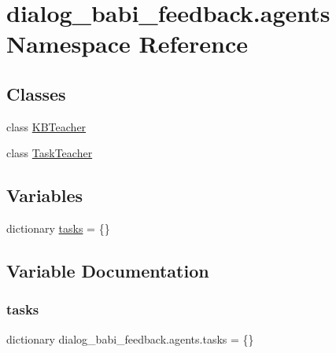 \hypertarget{namespacedialog__babi__feedback_1_1agents}{}\section{dialog\+\_\+babi\+\_\+feedback.\+agents Namespace Reference}
\label{namespacedialog__babi__feedback_1_1agents}
\subsection*{Classes}
\begin{DoxyCompactItemize}
\item 
class \hyperlink{classdialog__babi__feedback_1_1agents_1_1KBTeacher}{K\+B\+Teacher}
\item 
class \hyperlink{classdialog__babi__feedback_1_1agents_1_1TaskTeacher}{Task\+Teacher}
\end{DoxyCompactItemize}
\subsection*{Variables}
\begin{DoxyCompactItemize}
\item 
dictionary \hyperlink{namespacedialog__babi__feedback_1_1agents_a89d9d50942044a8f3a0ff974fa02c0a9}{tasks} = \{\}
\end{DoxyCompactItemize}


\subsection{Variable Documentation}
\mbox{\label{namespacedialog__babi__feedback_1_1agents_a89d9d50942044a8f3a0ff974fa02c0a9}} 
\subsubsection{\texorpdfstring{tasks}{tasks}}
{\footnotesize\ttfamily dictionary dialog\+\_\+babi\+\_\+feedback.\+agents.\+tasks = \{\}}

